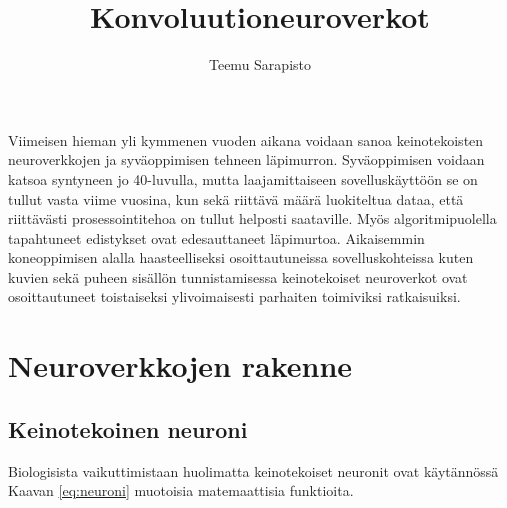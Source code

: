 \documentclass[11pt]{article}
\theoremstyle{plain}
\theoremstyle{definition}
\begin{document}
  \title{Konvoluutioneuroverkot}
  \author{Teemu Sarapisto}
  \maketitle




  Viimeisen hieman yli kymmenen vuoden aikana voidaan sanoa keinotekoisten neuroverkkojen ja syväoppimisen tehneen läpimurron. Syväoppimisen voidaan katsoa syntyneen jo 40-luvulla, mutta laajamittaiseen sovelluskäyttöön se on tullut vasta viime vuosina, kun sekä riittävä määrä luokiteltua dataa, että riittävästi prosessointitehoa on tullut helposti saataville. Myös algoritmipuolella tapahtuneet edistykset ovat edesauttaneet läpimurtoa. Aikaisemmin koneoppimisen alalla haasteelliseksi osoittautuneissa sovelluskohteissa kuten kuvien sekä puheen sisällön tunnistamisessa keinotekoiset neuroverkot ovat osoittautuneet toistaiseksi ylivoimaisesti parhaiten toimiviksi ratkaisuiksi.

  \section{Neuroverkkojen rakenne}
  \subsection{Keinotekoinen neuroni}


    Biologisista vaikuttimistaan huolimatta keinotekoiset neuronit ovat käytännössä Kaavan \ref{eq:neuroni} muotoisia matemaattisia funktioita.
\end{document}
